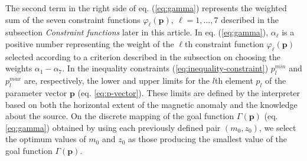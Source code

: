The second term in the right side of eq. (\ref{eq:gamma}) represents the weighted sum of
the seven constraint functions $\varphi_{\ell}(\mathbf{p}), \: \ell = 1, \dots, 7$ 
described in the subsection \textit{Constraint functions} later in this article.
In eq.  (\ref{eq:gamma}), $\alpha_{\ell}$ is a positive number representing the weight of the $\ell$th constraint function $\varphi_{\ell}(\mathbf{p})$ 
selected according to a criterion described in the subsection on choosing
the weights $\alpha_{1}-\alpha_{7}$.
In the inequality constraints (\ref{eq:inequality-constraint}) 
$p_{l}^{min}$ and $p_{l}^{max}$ are, respectively, the lower and upper limits for the $l$th element $p_{l}$ of the parameter vector $\mathbf{p}$ (eq. \ref{eq:p-vector}). 
These limits are defined by the interpreter 
based on both the horizontal extent of the magnetic anomaly and the knowledge about the 
source.
On the discrete mapping of the goal function $\Gamma (\mathbf{p})$ 
(eq. \ref{eq:gamma}) obtained by using each previously defined pair $(m_{0}, z_{0})$, 
we select the optimum values of $m_{0}$ and $z_{0}$ 
as those producing the smallest value of the goal function $\Gamma (\mathbf{p})$.

